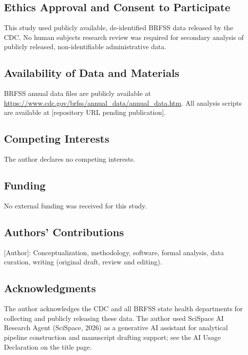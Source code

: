 \documentclass[12pt,a4paper]{article}
\begin{document}
\subsection*{Ethics Approval and Consent to Participate}
This study used publicly available, de-identified BRFSS data released by the
CDC. No human subjects research review was required for secondary analysis of
publicly released, non-identifiable administrative data.

\subsection*{Availability of Data and Materials}
BRFSS annual data files are publicly available at
\url{https://www.cdc.gov/brfss/annual\_data/annual\_data.htm}. All analysis
scripts are available at [repository URL pending publication].

\subsection*{Competing Interests}
The author declares no competing interests.

\subsection*{Funding}
No external funding was received for this study.

\subsection*{Authors' Contributions}
[Author]: Conceptualization, methodology, software, formal analysis, data
curation, writing (original draft, review and editing).

\subsection*{Acknowledgments}
The author acknowledges the CDC and all BRFSS state health departments for
collecting and publicly releasing these data. The author used SciSpace AI
Research Agent (SciSpace, 2026) as a generative AI assistant for analytical
pipeline construction and manuscript drafting support; see the AI Usage
Declaration on the title page.

\end{document}
